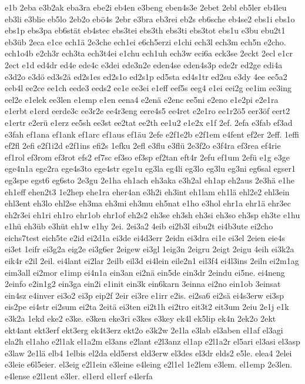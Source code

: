 {e1b
2eba
e3b2ak
eba3ra
ebe2i
eb4en
e3beng
eben4s3e
2ebet
2ebl
eb5ler
eb4leu
eb3li
e3blie
eb5lo
2eb2o
ebö4s
2ebr
e3bra
eb3rei
eb2s
eb6sche
eb4se2
ebs1i
ebs1o
ebs1p
ebs3pa
eb6stät
eb4stec
ebs3tei
ebs3th
ebs3ti
ebs3tot
ebs1u
e3bu
ebu2t1
eb3üb
2eca
e1ce
ech1ä
2e3che
ech1ei
e6ch5erzi
e1chi
ech3l
ech3m
ech5n
e2cho.
ech1o4b
e2ch3r
ech3ta
ech3t4ei
e1chu
ech1uh
ech3w
eci6a
eck3se
2eckt
2ecl
e1cr
2ect
e1d
ed4dr
ed4e
ede4c
e3dei
ede3n2e
eden4se
eden4s3p
ede2r
ed2ge
edi4a
e3d2o
e3dö
ed3s2ä
ed2s1es
ed2s1o
ed2s1p
ed5sta
ed4s1tr
ed2su
e3dy
4ee
ee5a2
eeb4l
ee2ce
ee1ch
eede3
eeds2
ee1e
ee3ei
e1eff
eef5s
eeg4
e1ei
eei2g
ee1im
ee3ing
eel2e
e1elek
ee3len
e1emp
e1en
eena4
e2enä
e2enc
ee5ni
e2eno
e1e2pi
e2e1ra
e1erbt
e1erd
eerde3c
ee3r2e
ee4r3eng
eere4s5
ee4ret
e2e1ro
ee1r2ö5
eer3öf
eert2
e1ertr
e2erü
e1erz
ee5sh
ee3st
ee2tat
ee2th
ee1u2
e1e2x
e1f
2ef.
2efa
e3fab
ef3ad
e3fah
ef1ana
ef1ank
ef1arc
ef1aus
ef1äu
2efe
e2f1e2b
e2f1em
e4fent
ef2er
2eff.
1effi
ef2fl
2efi
e2f1i2d
e2f1ins
efi2s
1efku
2efl
e3flu
e3flü
2e3f2o
e3f4ra
ef3rea
ef4rie
ef1rol
ef3rom
ef3rot
efs2
ef7sc
ef3so
ef3sp
ef2tan
eft4r
2efu
ef1um
2efü
e1g
e3ge
ege4n1a
ege2ra
ege4s3to
ege4str
ege1u
eg3la
eg4li
eg3lo
eg3lu
eg3ni
eg6sal
egser1
eg3spe
egst6
eg6sto
2e3gu
2e1ha
eh1ach
eh3aka
e3h2al
eh1ap
eh2aus
2e3hä
e1he
eh1eff
ehen2t3
1e2hep
ehe1ra
eher4an
e3h2i
eh3int
eh1lam
eh1lä
ehl2e2
ehl3ein
ehl3ent
eh3lo
ehl2se
eh3ma
eh3mi
eh3mu
eh5nat
e1ho
e3hol
ehr1a
ehr1ä
ehr3ec
eh2r3ei
eh1ri
eh1ro
ehr1ob
ehr1of
eh2s2
eh3se
eh3sh
eh3si
eh3so
eh3sp
eh3te
e1hu
e1hü
eh3üb
e3hüt
eh1w
e1hy
2ei.
2ei3a2
4eib
ei2b3l
eibu2t
ei4b3ute
ei2cho
eichs7test
eich5te
e2id
ei2d1a
ei3de
ei4d3err
2eidn
ei3dra
ei1e
ei3el
2eien
eie4s
ei3et
1eifr
ei3g2a
eig2e
ei3g6er
2eigew
ei3gl
1eig3n
2eigru
2eigt
2eigu
4eih
ei3k2a
eik4r
e2il
2eil.
ei4lant
ei2lar
2eilb
eil3d
ei4lein
eile2n1
eil3f4
ei4l3ins
2eiln
ei2m1ag
eim3all
ei2mor
e1imp
ei4n1a
ein3an
ei2nä
ein5de
ein3dr
2eindu
ei5ne.
ei4neng
2einfo
e2in1g2
ein3ga
ein2i
e1init
ein3k
ein6karn
3einna
ei2no
ein1ob
3einsat
ein4sz
e4inver
ei3o2
ei3p
eip2f
2eir
ei3re
e1irr
e2is.
ei2sa6
ei2sä
ei4s3erw
ei3sp
eis2pe
ei4str
ei2sum
ei2ta
2eitä
ei3ten
ei2t1h
ei2tro
eit3t2
eit3um
2eiu
2e1j
e1k
e3k2a
1ekd
eke2
e3ke.
e3ken
eke3ri
e3kes
e3key
ek4l
ek5lip
ek4n
2ek2o
2ekt
ekt4ant
ekt3erf
ekt3erg
ek4t3erz
ekt2o
e3k2w
2e1la
e3lab
el3aben
el1af
el3agi
ela2h
el1aho
e2l1ak
el1a2m
el3ans
e2lant
e2l3anz
el1ap
e2l1a2r
el5ari
el3asi
el3asp
e3law
2e1lä
elb4
1elbis
el2da
eld5erst
eld3erw
el3des
el3dr
elds2
e5le.
elea4
2elei
e3leie
e6l5eier.
el3eig
e2l1ein
e3leine
e4leing
e2l1el
1e2lem
e3lem.
el1emp
2e3len.
e4lense
e2l1ent
e3ler.
el1erd
el1erf
e4lerfa
}
